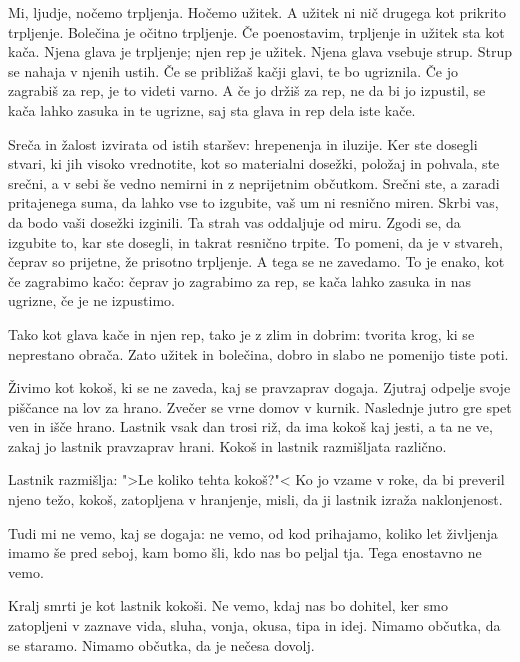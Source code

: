 \clearpage


Mi, ljudje, nočemo trpljenja. Hočemo užitek. A užitek ni nič drugega kot prikrito trpljenje. Bolečina je očitno trpljenje. Če poenostavim, trpljenje in užitek sta kot kača. Njena glava je trpljenje; njen rep je užitek. Njena glava vsebuje strup. Strup se nahaja v njenih ustih. Če se približaš kačji glavi, te bo ugriznila. Če jo zagrabiš za rep, je to videti varno. A če jo držiš za rep, ne da bi jo izpustil, se kača lahko zasuka in te ugrizne, saj sta glava in rep dela iste kače.

Sreča in žalost izvirata od istih staršev: hrepenenja in iluzije. Ker ste dosegli stvari, ki jih visoko vrednotite, kot so materialni dosežki, položaj in pohvala, ste srečni, a v sebi še vedno nemirni in z neprijetnim občutkom. Srečni ste, a zaradi pritajenega suma, da lahko vse to izgubite, vaš um ni resnično miren. Skrbi vas, da bodo vaši dosežki izginili. Ta strah vas oddaljuje od miru. Zgodi se, da izgubite to, kar ste dosegli, in takrat resnično trpite. To pomeni, da je v stvareh, čeprav so prijetne, že prisotno trpljenje. A tega se ne zavedamo. To je enako, kot če zagrabimo kačo: čeprav jo zagrabimo za rep, se kača lahko zasuka in nas ugrizne, če je ne izpustimo.

Tako kot glava kače in njen rep, tako je z zlim in dobrim: tvorita krog, ki se neprestano obrača. Zato užitek in bolečina, dobro in slabo ne pomenijo tiste poti.

\clearpage


Živimo kot kokoš, ki se ne zaveda, kaj se pravzaprav dogaja. Zjutraj odpelje svoje piščance na lov za hrano. Zvečer se vrne domov v kurnik. Naslednje jutro gre spet ven in išče hrano. Lastnik vsak dan trosi riž, da ima kokoš kaj jesti, a ta ne ve, zakaj jo lastnik pravzaprav hrani. Kokoš in lastnik razmišljata različno.

Lastnik razmišlja: ">Le koliko tehta kokoš?"< Ko jo vzame v roke, da bi preveril njeno težo, kokoš, zatopljena v hranjenje, misli, da ji lastnik izraža naklonjenost.

Tudi mi ne vemo, kaj se dogaja: ne vemo, od kod prihajamo, koliko let življenja imamo še pred seboj, kam bomo šli, kdo nas bo peljal tja. Tega enostavno ne vemo.

Kralj smrti je kot lastnik kokoši. Ne vemo, kdaj nas bo dohitel, ker smo zatopljeni v zaznave vida, sluha, vonja, okusa, tipa in idej. Nimamo občutka, da se staramo. Nimamo občutka, da je nečesa dovolj.

